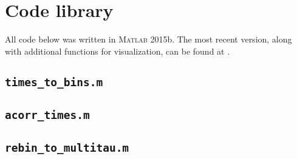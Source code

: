 %
    
\appendix


\chapter{Code library}
All code below was written in \textsc{Matlab} 2015b. The most recent version, along with additional functions for visualization, can be found at \coderepolink.

\section{\texttt{times\_to\_bins.m}} \label{code:times_to_bins}


\section{\texttt{acorr\_times.m}} \label{code:acorr_times}


\section{\texttt{rebin\_to\_multitau.m}} \label{code:rebin_to_multitau}


